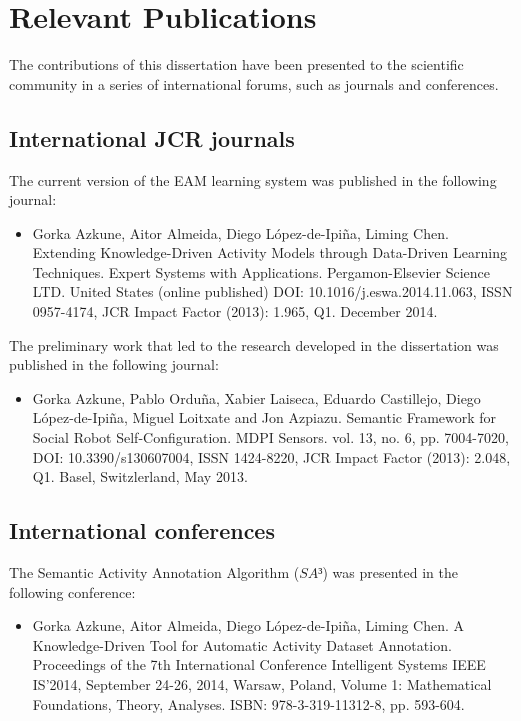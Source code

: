 \section{Relevant Publications}
\label{sec:conclusions:pub}

The contributions of this dissertation have been presented to the scientific community in a series of international forums, such as journals and conferences.

\subsection{International JCR journals}

The current version of the EAM learning system was published in the following journal:

\begin{itemize}
 \item Gorka Azkune, Aitor Almeida, Diego López-de-Ipiña, Liming Chen. Extending Knowledge-Driven Activity Models through Data-Driven Learning Techniques. Expert Systems with Applications. Pergamon-Elsevier Science LTD. United States (online published) DOI: 10.1016/j.eswa.2014.11.063, ISSN 0957-4174, JCR Impact Factor (2013): 1.965, Q1. December 2014. 
\end{itemize}

The preliminary work that led to the research developed in the dissertation was published in the following journal:

\begin{itemize}
 \item Gorka Azkune, Pablo Orduña, Xabier Laiseca, Eduardo Castillejo, Diego López-de-Ipiña, Miguel Loitxate and Jon Azpiazu. Semantic Framework for Social Robot Self-Configuration. MDPI Sensors. vol. 13, no. 6, pp. 7004-7020, DOI: 10.3390/s130607004, ISSN 1424-8220, JCR Impact Factor (2013): 2.048, Q1. Basel, Switzlerland, May 2013.
\end{itemize}

\subsection{International conferences}

The Semantic Activity Annotation Algorithm ($SA³$) was presented in the following conference:

\begin{itemize}
 \item Gorka Azkune, Aitor Almeida, Diego López-de-Ipiña, Liming Chen. A Knowledge-Driven Tool for Automatic Activity Dataset Annotation. Proceedings of the 7th International Conference Intelligent Systems IEEE IS’2014, September 24-26, 2014, Warsaw, Poland, Volume 1: Mathematical Foundations, Theory, Analyses. ISBN: 978-3-319-11312-8, pp. 593-604.
\end{itemize}

